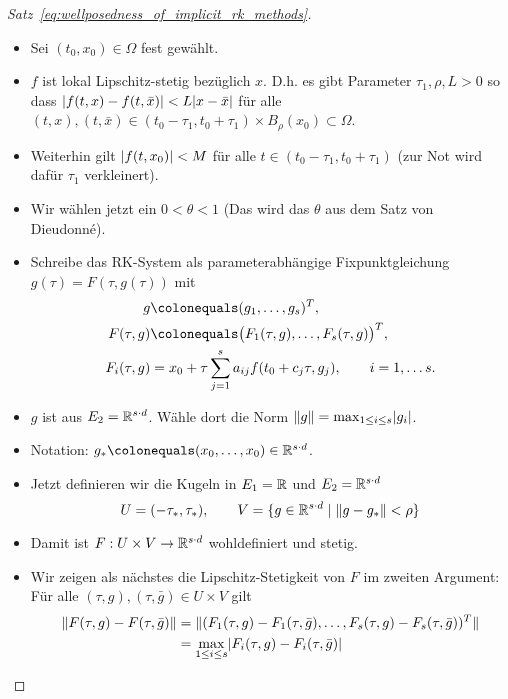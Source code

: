 \begin{proof}[Satz~\ref{eq:wellposedness_of_implicit_rk_methods}]
	\begin{itemize}
		\item Sei $(t_0,x_0) \in \Omega$ fest gewählt.
		\item $f$ ist lokal Lipschitz-stetig bezüglich $x$. D.h. es gibt Parameter $\tau_1, \rho, L > 0$ so dass $\lvert f(t,x) - f(t,\bar x) \rvert < L \lvert x - \bar x \rvert$ für alle $(t,x), (t, \bar x) \in (t_0 - \tau_1, t_0 + \tau_1) \times B_\rho (x_0) \subset \Omega$.
		\item Weiterhin gilt $\lvert f(t,x_0) \rvert < M$ für alle $t \in (t_0 - \tau_1, t_0 + \tau_1)$ (zur Not wird dafür $\tau_1$ verkleinert).
		\item Wir wählen jetzt ein $0 < \theta < 1$ (Das wird das $\theta$ aus dem Satz von Dieudonn\'e).
		\item Schreibe das RK-System als parameterabhängige Fixpunktgleichung $g(\tau) = F(\tau,g(\tau))$ mit 
		\begin{align*}
			g &\colonequals (g_1, \dots, g_s)^T, \\
			F(\tau,g) &\colonequals \big( F_1(\tau, g), \dots, F_s(\tau,g) \big)^T, \\
			F_i(\tau,g) &= x_0 + \tau \sum_{j=1}^{s} a_{ij} f(t_0 + c_j \tau, g_j), \qquad i = 1,\dots s.
		\end{align*}
		\item $g$ ist aus $E_2 = \mathbb R^{s \cdot d}$. Wähle dort die Norm $ \lVert g \rVert = \max_{1 \le i \le s} \lvert g_i \rvert$.
		\item Notation: $g_\ast \colonequals (x_0, \dots, x_0) \in \R^{s\cdot d}$.
		\item Jetzt definieren wir die Kugeln in $E_1 = \mathbb R$ und $E_2 = \mathbb R^{s\cdot d}$
		\begin{equation*}
			U = (-\tau_\ast, \tau_\ast), \qquad V = \{ g \in \mathbb R^{s\cdot d} \mid \lVert g - g_\ast \rVert < \rho \}
		\end{equation*}		
		\item Damit ist  $F: U \times V \rightarrow \mathbb R^{s\cdot d}$  wohldefiniert und stetig.
		\item Wir zeigen als nächstes die Lipschitz-Stetigkeit von $F$ im zweiten Argument: 
		Für alle $(\tau,g), (\tau, \bar g) \in U \times V$ gilt
		\begin{align*}
			\norm{F(\tau,g) - F(\tau, \bar g)} & = 
			\norm{(F_1(\tau,g) - F_1(\tau, \bar g), \dots, F_s(\tau, g) - F_s(\tau, \bar g))^T} \\
			&= \max_{1\le i \le s} \abs{F_i(\tau,g) - F_i(\tau, \bar g)} \\

\end{align*}
\end{itemize}
\end{proof}
